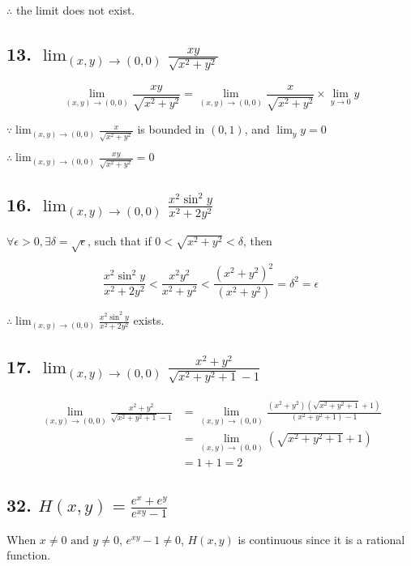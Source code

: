 \documentclass{article}
\begin{document}
    $\therefore $ the limit does not exist.

    \subsection*{13. $\lim_{(x, y) \to (0, 0)} \frac{xy}{\sqrt{x^2 + y^2}}$}

    $$\lim_{(x, y) \to (0, 0)} \frac{xy}{\sqrt{x^2 + y^2}} = \lim_{(x, y) \to (0, 0)} \frac{x}{\sqrt{x^2 + y^2}} \times \lim_{y \to 0} y$$

    $\because \lim_{(x, y) \to (0, 0)} \frac{x}{\sqrt{x^2 + y^2}}$ is bounded in $(0, 1)$, and $\lim_y y = 0$

    $\therefore \lim_{(x, y) \to (0, 0)} \frac{xy}{\sqrt{x^2 + y^2}} = 0$

    \subsection*{16. $\lim_{(x, y) \to (0, 0)} \frac{x^2\sin^2 y}{x^2 + 2y^2}$}

    $\forall \epsilon > 0, \exists \delta = \sqrt{\epsilon}$, such that if $0 < \sqrt{x^2 + y^2} < \delta$, then

    $$\frac{x^2\sin^2 y}{x^2 + 2y^2} < \frac{x^2y^2}{x^2 + y^2} < \frac{(x^2 + y^2)^2}{(x^2 + y^2)} = \delta^2 = \epsilon$$

    $\therefore \lim_{(x, y) \to (0, 0)} \frac{x^2\sin^2 y}{x^2 + 2y^2}$ exists.

    \subsection*{17. $\lim_{(x, y) \to (0, 0)} \frac{x^2 + y^2}{\sqrt{x^2 + y^2 + 1} - 1}$}

    $$\begin{aligned}
        \lim_{(x, y) \to (0, 0)} \frac{x^2 + y^2}{\sqrt{x^2 + y^2 + 1} - 1} &= \lim_{(x, y)\to (0, 0)} \frac{(x^2 + y^2)(\sqrt{x^2 + y^2 + 1} + 1)}{(x^2 + y^2 + 1) - 1} \\
        &= \lim_{(x, y) \to (0, 0)}(\sqrt{x^2 + y^2 + 1} + 1) \\ 
        &= 1 + 1 = 2
    \end{aligned}$$

    \subsection*{32. $H(x, y) = \frac{e^x + e^y}{e^{xy} - 1}$}

    When $x \not = 0 \textrm{ and } y \not = 0$, $e^{xy} - 1 \not = 0$, $H(x, y)$ is continuous since it is a rational function.
\end{document}
